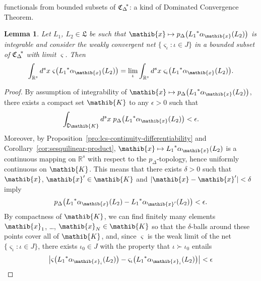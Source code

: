 \documentclass[a4paper,a4paper]{article}
\numberwithin{equation}{section}
\newcommand{\Lfrak}{\mathfrak{L}}
\newcommand{\Kib}{\mathib{K}}
\newcommand{\xib}{\mathib{x}}
\newcommand{\Rs}{\mathbb{R}^s}
\newcommand{\CDstar}{{\mathfrak{C}_\Delta}^{\negthickspace *}}
\newcommand{\aibx}{\alpha_\mathib{x}}
\newcommand{\aibxprime}{\alpha_{\mathib{x}'}}
\theoremstyle{definition}
\theoremstyle{plain}
\newtheorem{lemma}[definition]{Lemma}
\theoremstyle{remark}
\newcommand{\bset}[1]{\bigl\{ #1 \bigr\}}
\newcommand{\abs}[1]{\lvert #1 \rvert}
\newcommand{\babs}[1]{\bigl\lvert #1 \bigr\rvert}
\newcommand{\pD}{p_\Delta}
\newcommand{\bpDx}[1]{p_\Delta \bigl( #1 \bigr)}
\begin{document}
  functionals from bounded subsets of $\CDstar$: a kind of Dominated
  Convergence Theorem.
  \begin{lemma}
    \label{lem:varsigmanet-convergence}
    Let $L_1$, $L_2 \in \Lfrak$ be such that $\xib \mapsto
    \bpDx{{L_1}^* \aibx ( L_2 )}$ is integrable and consider the
    weakly convergent net $\bset{\varsigma_\iota : \iota \in J}$ in
    a bounded subset of $\CDstar$ with limit $\varsigma$. Then
    \begin{equation}
      \label{eq:integral-net-limits}
      \int_{\Rs} d^s x \; \varsigma \bigl( {L_1}^* \aibx ( L_2 )
      \bigr) = \lim_\iota \int_{\Rs} d^s x \; \varsigma_\iota \bigl(
      {L_1}^* \aibx ( L_2 ) \bigr) \text{.}
    \end{equation}
  \end{lemma}
  \begin{proof}
    By assumption of integrability of $\xib \mapsto \bpDx{{L_1}^*
    \aibx ( L_2 )}$, there exists a compact set $\Kib$ to any
    $\epsilon > 0$ such that
    \begin{equation}
      \label{eq:complement-integral}
      \int_{\complement \Kib} d^s x \; \bpDx{{L_1}^* \aibx ( L_2 )} <
      \epsilon \text{.}
    \end{equation}
    Moreover, by
    Proposition~\ref{pro:lcs-continuity-differentiability} and
    Corollary~\ref{cor:sesquilinear-product}, $\xib \mapsto {L_1}^*
    \aibx ( L_2 )$ is a continuous mapping on $\Rs$ with respect to
    the $\pD$-topology, hence uniformly continuous on $\Kib$. This
    means that there exists $\delta > 0$ such that $\xib$, $\xib' \in
    \Kib$ and $\abs{\xib - \xib'} < \delta$ imply
    \begin{equation}
      \label{eq:pD-delta-estimate}
      \bpDx{{L_1}^* \aibx ( L_2 ) - {L_1}^* \aibxprime ( L_2 )} <
      \epsilon \text{.}
    \end{equation}
    By compactness of $\Kib$, we can find finitely many elements
    $\xib_1$, \dots, $\xib_N \in \Kib$ so that the $\delta$-balls
    around these points cover all of $\Kib$, and, since $\varsigma$ is
    the weak limit of the net $\bset{\varsigma_\iota : \iota \in J}$,
    there exists $\iota_0 \in J$ with the property that $\iota \succ
    \iota_0$ entails
    \begin{equation}
      \label{eq:net-estimate}
      \babs{\varsigma \bigl( {L_1}^* \alpha_{\xib_i} ( L_2 ) \bigr) -
      \varsigma_\iota \bigl( {L_1}^* \alpha_{\xib_i} ( L_2 ) \bigr)} < 
      \epsilon
    \end{equation}

\end{proof}
\end{document}
